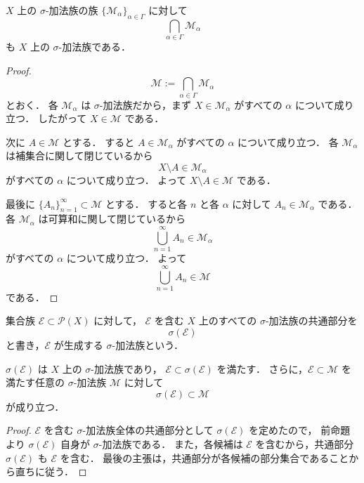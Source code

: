 \begin{proposition}[共通部分]
$X$ 上の $\sigma$-加法族の族 $\{\mathcal M_\alpha\}_{\alpha \in \Gamma}$ に対して
\[
\bigcap_{\alpha \in \Gamma}\mathcal M_\alpha
\]
も $X$ 上の $\sigma$-加法族である．
\end{proposition}
\begin{proof}
\[
\mathcal M:=\bigcap_{\alpha \in \Gamma}\mathcal M_\alpha
\]
とおく．
各 $\mathcal M_\alpha$ は $\sigma$-加法族だから，まず $X \in \mathcal M_\alpha$ がすべての $\alpha$ について成り立つ．
したがって $X \in \mathcal M$ である．

次に $A \in \mathcal M$ とする．
すると $A \in \mathcal M_\alpha$ がすべての $\alpha$ について成り立つ．
各 $\mathcal M_\alpha$ は補集合に関して閉じているから
\[
X\setminus A \in \mathcal M_\alpha
\]
がすべての $\alpha$ について成り立つ．
よって $X\setminus A \in \mathcal M$ である．

最後に $\{A_n\}_{n=1}^{\infty}\subset \mathcal M$ とする．
すると各 $n$ と各 $\alpha$ に対して $A_n \in \mathcal M_\alpha$ である．
各 $\mathcal M_\alpha$ は可算和に関して閉じているから
\[
\bigcup_{n=1}^{\infty}A_n \in \mathcal M_\alpha
\]
がすべての $\alpha$ について成り立つ．
よって
\[
\bigcup_{n=1}^{\infty}A_n \in \mathcal M
\]
である．
\end{proof}

\begin{definition}
集合族 $\mathcal E \subset \mathcal P(X)$ に対して，
$\mathcal E$ を含む $X$ 上のすべての $\sigma$-加法族の共通部分を
\[
\sigma(\mathcal E)
\]
と書き，$\mathcal E$ が生成する $\sigma$-加法族という．
\end{definition}

\begin{proposition}
$\sigma(\mathcal E)$ は $X$ 上の $\sigma$-加法族であり，
$\mathcal E \subset \sigma(\mathcal E)$ を満たす．
さらに，$\mathcal E \subset \mathcal M$ を満たす任意の $\sigma$-加法族 $\mathcal M$ に対して
\[
\sigma(\mathcal E) \subset \mathcal M
\]
が成り立つ．
\end{proposition}
\begin{proof}
$\mathcal E$ を含む $\sigma$-加法族全体の共通部分として $\sigma(\mathcal E)$ を定めたので，
前命題より $\sigma(\mathcal E)$ 自身が $\sigma$-加法族である．
また，各候補は $\mathcal E$ を含むから，共通部分 $\sigma(\mathcal E)$ も $\mathcal E$ を含む．
最後の主張は，共通部分が各候補の部分集合であることから直ちに従う．
\end{proof}

